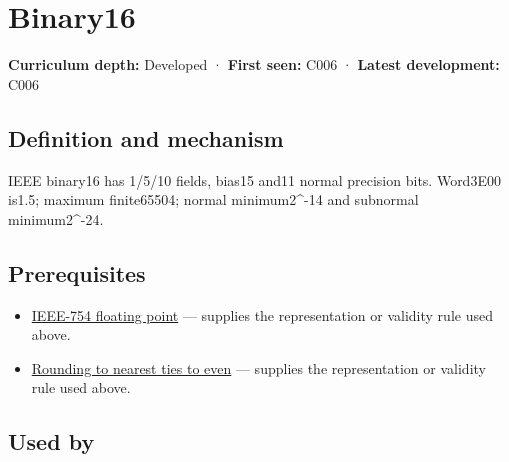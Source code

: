 \hypertarget{appendix-34443cec7170}{}\label{referencestart:appendix-34443cec7170}
\section{Binary16}\label{appendix-34443cec7170-binary16}

\hypertarget{appendix-34443cec7170-binary16}{}

\textbf{Curriculum depth:} Developed · \textbf{First seen:} C006 · \textbf{Latest development:} C006

\begin{allmightroledefinition}

\subsection{Definition and mechanism}\label{appendix-34443cec7170-definition-and-mechanism}

\hypertarget{appendix-34443cec7170-definition-and-mechanism}{}

IEEE binary16 has 1/5/10 fields, bias15 and11 normal precision bits. Word3E00 is1.5; maximum finite65504; normal minimum2\^{}-14 and subnormal minimum2\^{}-24.

\end{allmightroledefinition}

\subsection{Prerequisites}\label{appendix-34443cec7170-prerequisites}

\hypertarget{appendix-34443cec7170-prerequisites}{}

\begin{itemize}
\tightlist
\item
  \hyperref[appendix-343615f49ddf]{IEEE-754 floating point} --- supplies the representation or validity rule used above.
\item
  \hyperref[appendix-614afe1de592]{Rounding to nearest ties to even} --- supplies the representation or validity rule used above.
\end{itemize}

\subsection{Used by}\label{appendix-34443cec7170-used-by}

\hypertarget{appendix-34443cec7170-used-by}{}

